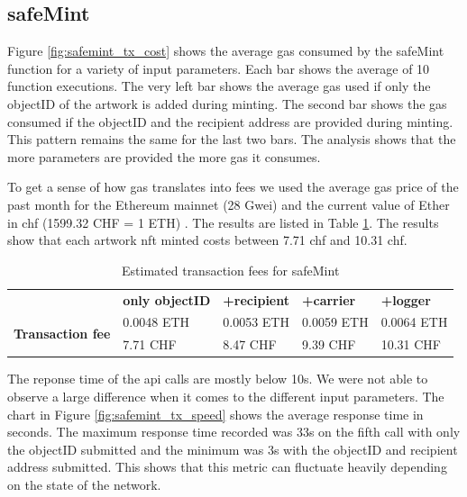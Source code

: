 \subsection*{safeMint}
Figure \ref{fig:safemint_tx_cost} shows the average gas consumed by the safeMint function for a variety of input parameters. Each bar shows the average of 10 function executions. The very left bar shows the average gas used if only the objectID of the artwork is added during minting. The second bar shows the gas consumed if the objectID and the recipient address are provided during minting. This pattern remains the same for the last two bars. The analysis shows that the more parameters are provided the more gas it consumes.

To get a sense of how gas translates into fees we used the average gas price of the past month for the Ethereum mainnet (28 Gwei) \cite{gaspriceaverage} and the current value of Ether in \gls{chf} (1599.32 CHF = 1 ETH) \cite{coinmarketcap}. The results are listed in Table \ref{tab:safemint_tx_fees}. The results show that each artwork \gls{nft} minted costs between 7.71 \gls{chf} and 10.31 \gls{chf}.  

\begin{table}[h]
\begin{tabular}{cllll}
                                          & \textbf{only objectID} & \textbf{+recipient} & \textbf{+carrier} & \textbf{+logger} \\ \cline{2-5} 
\multirow{2}{*}{\textbf{Transaction fee}} & 0.0048 ETH             & 0.0053 ETH          & 0.0059 ETH        & 0.0064 ETH       \\
                                          & 7.71 CHF               & 8.47 CHF            & 9.39 CHF          & 10.31 CHF       
\end{tabular}
\caption{Estimated transaction fees for safeMint}
\label{tab:safemint_tx_fees}
\end{table}

The reponse time of the \gls{api} calls are mostly below 10s. We were not able to observe a large difference when it comes to the different input parameters. The chart in Figure \ref{fig:safemint_tx_speed} shows the average response time in seconds. The maximum response time recorded was 33s on the fifth call with only the objectID submitted and the minimum was 3s with the objectID and recipient address submitted. This shows that this metric can fluctuate heavily depending on the state of the network.

